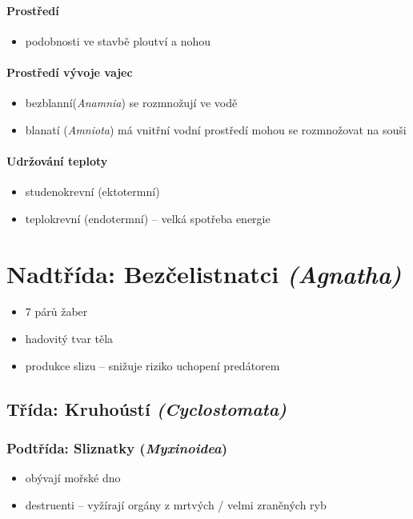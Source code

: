 \paragraph{Prostředí}
\begin{itemize}
\item podobnosti ve stavbě ploutví a nohou
\end{itemize}

\paragraph{Prostředí vývoje vajec}
\begin{itemize}
\item bezblanní(\textit{Anamnia}) se rozmnožují ve vodě
\item blanatí (\textit{Amniota}) má vnitřní vodní prostředí \ra mohou se rozmnožovat na souši
\end{itemize}

\paragraph{Udržování teploty}
\begin{itemize}
\item studenokrevní (ektotermní)
\item teplokrevní (endotermní) -- velká spotřeba energie
\end{itemize}

\newpage
\section{Nadtřída: Bezčelistnatci \textit{(Agnatha)}}
\begin{itemize}
\item 7 párů žaber
\item hadovitý tvar těla
\item produkce slizu -- snižuje riziko uchopení predátorem
\end{itemize}

\subsection{Třída: Kruhoústí \textit{(Cyclostomata)}}
\subsubsection{Podtřída: Sliznatky (\textit{Myxinoidea})}
\begin{itemize}
\item obývají mořské dno
\item destruenti -- vyžírají orgány z mrtvých / velmi zraněných ryb
\end{itemize}

